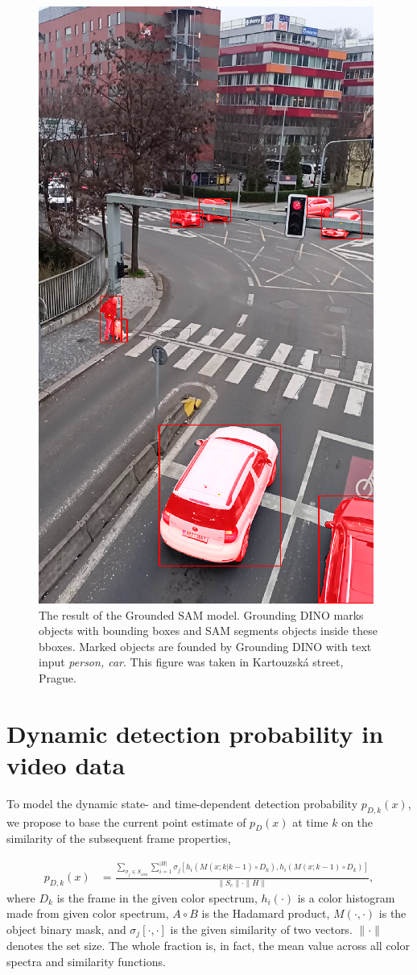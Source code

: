 \begin{figure}[h]
  \centering
  \includegraphics[width=0.35\linewidth]{text/chapter_04/imgs/DINO_example}
  \caption{The result of the Grounded SAM model. Grounding DINO marks objects with bounding boxes and SAM segments
  objects inside these bboxes. Marked objects are founded by Grounding DINO with text input \textit{person, car}. This figure was taken in
  Kartouzská street, Prague.}
  \label{fig:GroundedSAM}
\end{figure}



\section{Dynamic detection probability in video data}
\label{sec:dynamic_pd}
To model the dynamic state- and time-dependent detection probability $p_{D,k}(x)$, we propose to base the current
point estimate of $p_{D}(x)$ at time $k$ on the similarity of the subsequent frame properties,

  \begin{align}
    p_{D,k}(x) &= \frac{\sum_{\sigma_j \in S_{sim}} \sum_{i=1}^{|H|}
      \sigma_j\left[h_i\left(M(x; k|k-1) \!\circ\! D_k\right),
        h_i\left(M(x; k-1) \!\circ\! D_k\right)\right]}{\|S_c\| \cdot \|H\|}, \label{eq:similarity}
  \end{align}
where $D_k$ is the frame in the given color spectrum, $h_i(\cdot)$ is a color histogram made from given color spectrum, $A\circ B$ is the Hadamard product, $M(\cdot, \cdot)$ is the object binary mask, and $\sigma_j[\cdot, \cdot]$ is
the given similarity of two vectors. $\|\cdot\|$ denotes the set size. The whole
fraction is, in fact, the mean value across all color spectra and similarity functions.

